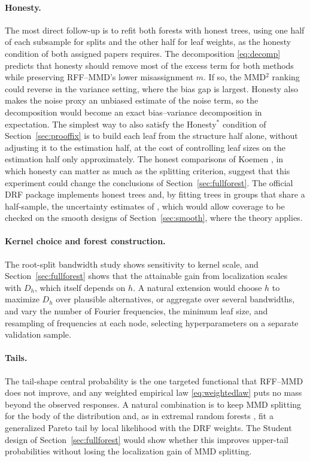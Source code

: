 \documentclass[12pt,a4paper]{article}
\newcommand{\1}{\mathbf 1}
\begin{document}
\paragraph{Honesty.}
The most direct follow-up is to refit both forests with honest trees, using one half of each subsample for splits and the other half for leaf weights, as the honesty condition of both assigned papers requires. The decomposition \eqref{eq:decomp} predicts that honesty should remove most of the excess term for both methods while preserving RFF--MMD's lower misassignment $m$. If so, the MMD$^2$ ranking could reverse in the variance setting, where the bias gap is largest. Honesty also makes the noise proxy an unbiased estimate of the noise term, so the decomposition would become an exact bias--variance decomposition in expectation. The simplest way to also satisfy the Honesty$^*$ condition of Section~\ref{sec:prooffix} is to build each leaf from the structure half alone, without adjusting it to the estimation half, at the cost of controlling leaf sizes on the estimation half only approximately. The honest comparisons of Koemen \cite{koemen2026}, in which honesty can matter as much as the splitting criterion, suggest that this experiment could change the conclusions of Section~\ref{sec:fullforest}. The official DRF package \cite{cevid2022} implements honest trees and, by fitting trees in groups that share a half-sample, the uncertainty estimates of \cite{naf2023}, which would allow coverage to be checked on the smooth designs of Section~\ref{sec:smooth}, where the theory applies.

\paragraph{Kernel choice and forest construction.}
The root-split bandwidth study shows sensitivity to kernel scale, and Section~\ref{sec:fullforest} shows that the attainable gain from localization scales with $D_h$, which itself depends on $h$. A natural extension would choose $h$ to maximize $D_h$ over plausible alternatives, or aggregate over several bandwidths, and vary the number of Fourier frequencies, the minimum leaf size, and resampling of frequencies at each node, selecting hyperparameters on a separate validation sample.

\paragraph{Tails.}
The tail-shape central probability is the one targeted functional that RFF--MMD does not improve, and any weighted empirical law \eqref{eq:weightedlaw} puts no mass beyond the observed responses. A natural combination is to keep MMD splitting for the body of the distribution and, as in extremal random forests \cite{gnecco2024}, fit a generalized Pareto tail by local likelihood with the DRF weights. The Student design of Section~\ref{sec:fullforest} would show whether this improves upper-tail probabilities without losing the localization gain of MMD splitting.
\end{document}
